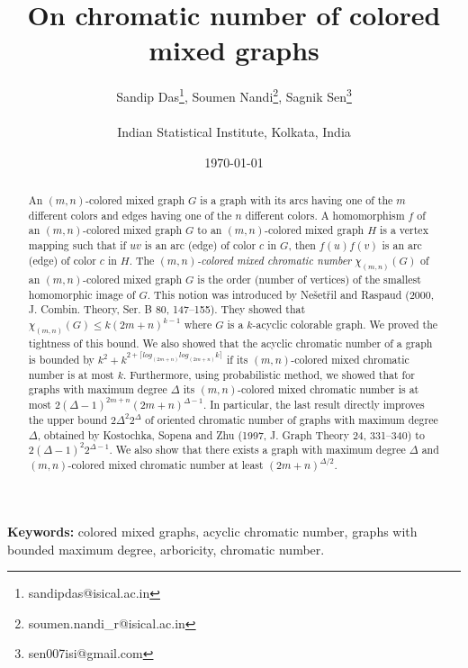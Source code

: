 \documentclass[11pt]{article}
\begin{document}
\title{{\bf On chromatic number of colored mixed graphs}}
\author{
{\sc Sandip Das\footnote{{\small sandipdas@isical.ac.in}}}, {\sc Soumen Nandi\footnote{{\small soumen.nandi\_r@isical.ac.in}}}, {\sc Sagnik Sen\footnote{{\small sen007isi@gmail.com}}}\\
\mbox{}\\
{\small Indian Statistical Institute, Kolkata, India}\\
}




\date{\today}

\maketitle

\begin{abstract}
An $(m,n)$-colored mixed graph $G$ is a graph  with its arcs having one of the $m$ different colors and edges having one of the $n$ different colors. A homomorphism $f$ of an $(m,n)$-colored mixed graph $G$   to an  $(m,n)$-colored mixed graph $H$ is a vertex mapping such that if $uv$ is an arc (edge) of color $c$ in $G$, then $f(u)f(v)$ is an arc (edge) of  color $c$ in $H$. The \textit{$(m,n)$-colored mixed chromatic number} $\chi_{(m,n)}(G)$ of an   $(m,n)$-colored mixed graph $G$ is the 
order (number of vertices)
of the smallest homomorphic image of $G$. This notion was introduced by 
Ne\v{s}et\v{r}il and Raspaud (2000,  J. Combin. Theory, Ser. B 80, 147--155). 
They showed that $\chi_{(m,n)}(G) \leq k(2m+n)^{k-1}$ where $G$ is a $k$-acyclic colorable graph.  We proved the tightness of this bound. 
We also showed that the acyclic chromatic number of a graph is bounded by $k^2 + k^{2 + \lceil log_{(2m+n)} log_{(2m+n)} k \rceil}$ if its 
$(m,n)$-colored mixed chromatic number is at most $k$.  
Furthermore, using probabilistic method, we showed that for graphs with maximum degree $\Delta$ its $(m,n)$-colored mixed chromatic number is at most 
$2(\Delta-1)^{2m+n} (2m+n)^{\Delta-1}$. 
In particular, the last result directly improves the upper bound  $2\Delta^2 2^{\Delta}$ of oriented chromatic number of 
graphs with  maximum degree $\Delta$, obtained by Kostochka, Sopena and Zhu (1997, J. Graph Theory 24, 331--340)  to $2(\Delta-1)^2 2^{\Delta -1}$. 
We also show that there exists a graph with maximum degree $\Delta$ and $(m,n)$-colored mixed chromatic number at least $(2m+n)^{\Delta / 2}$. 
 \end{abstract}


\noindent \textbf{Keywords:} colored mixed graphs, acyclic chromatic number, graphs with bounded maximum degree, arboricity, chromatic number.
\end{document}
